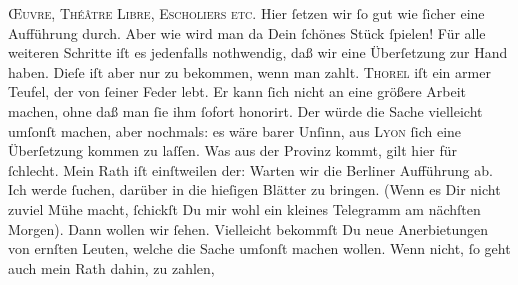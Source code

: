 \begin{ledgroupsized}[t]{13cm}
                  \textsc{Œuvre, Théâtre
                     Libre, Escholiers etc}.  Hier ſetzen wir ſo gut wie ſicher eine Aufführung
               durch. Aber wie wird man da Dein ſchönes Stück ſpielen!\pend
           \pstart
           Für alle weiteren Schritte iſt es  jedenfalls
               nothwendig, daß wir eine Überſetzung zur Hand haben. Dieſe iſt aber nur zu bekommen,
               wenn man zahlt. \textsc{Thorel} iſt ein armer  Teufel, {\pb}der von ſeiner Feder lebt. Er kann
               ſich nicht an eine größere Arbeit machen, ohne daß man ſie ihm ſofort honorirt.  Der \label{K_L02766-4v}\label{K_L02766-4h} würde die Sache vielleicht umſonſt machen, aber nochmals: es wäre barer
               Unſinn, aus \textsc{Lyon} ſich eine Überſetzung kommen zu laſſen.  Was
               aus der Provinz kommt, gilt hier für ſchlecht. Mein Rath iſt einſtweilen der: Warten
               wir die Berliner Aufführung {\pb}ab. Ich werde ſuchen, \label{K_L02766-5v}\label{K_L02766-5h} darüber in die hieſigen Blätter zu bringen. (Wenn es Dir nicht zuviel Mühe
               macht, ſchickſt Du mir wohl ein kleines Telegramm am nächſten Morgen). Dann wollen
               wir ſehen. Vielleicht bekommſt Du neue Anerbietungen von ernſten Leuten, welche die
               Sache umſonſt machen wollen. Wenn nicht, ſo geht auch mein Rath dahin, zu zahlen,

\end{ledgroupsized}
